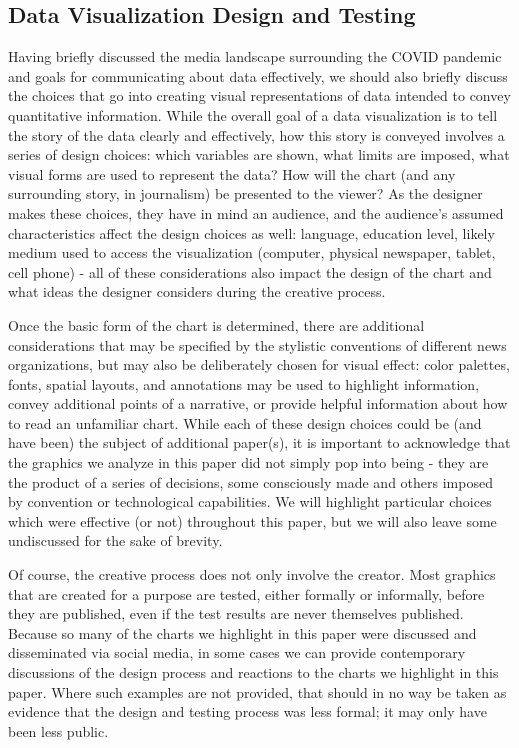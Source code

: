 \documentclass[article]{jdssv}\usepackage[]{graphicx}\usepackage[]{xcolor}
\begin{document}
\subsection{Data Visualization Design and Testing}
Having briefly discussed the media landscape surrounding the COVID pandemic and goals for communicating about data effectively, we should also briefly discuss the choices that go into creating visual representations of data intended to convey quantitative information.
While the overall goal of a data visualization is to tell the story of the data clearly and effectively, how this story is conveyed involves a series of design choices: which variables are shown, what limits are imposed, what visual forms are used to represent the data? 
How will the chart (and any surrounding story, in journalism) be presented to the viewer? 
As the designer makes these choices, they have in mind an audience, and the audience's assumed characteristics affect the design choices as well: language, education level, likely medium used to access the visualization (computer, physical newspaper, tablet, cell phone) - all of these considerations also impact the design of the chart and what ideas the designer considers during the creative process.

Once the basic form of the chart is determined, there are additional considerations that may be specified by the stylistic conventions of different news organizations, but may also be deliberately chosen for visual effect: color palettes, fonts, spatial layouts, and annotations may be used to highlight information, convey additional points of a narrative, or provide helpful information about how to read an unfamiliar chart.
While each of these design choices could be (and have been) the subject of  additional paper(s), it is important to acknowledge that the graphics we analyze in this paper did not simply pop into being - they are the product of a series of decisions, some consciously made and others imposed by convention or technological capabilities.
We will highlight particular choices which were effective (or not) throughout this paper, but we will also leave some undiscussed for the sake of brevity.

Of course, the creative process does not only involve the creator. Most graphics that are created for a purpose are tested, either formally or informally, before they are published, even if the test results are never themselves published. Because so many of the charts we highlight in this paper were discussed and disseminated via social media, in some cases we can provide contemporary discussions of the design process and reactions to the charts we highlight in this paper. Where such examples are not provided, that should in no way be taken as evidence that the design and testing process was less formal; it may only have been less public.
\end{document}
